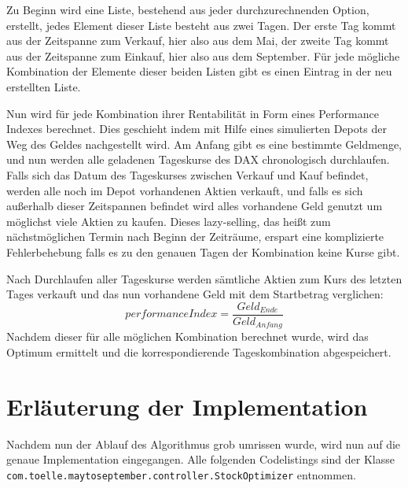 \documentclass[12pt, a4paper, titlepage]{report}
\begin{document}
            Zu Beginn wird eine Liste, bestehend aus jeder durchzurechnenden Option,
            erstellt, jedes Element dieser Liste besteht aus zwei Tagen. Der erste Tag 
            kommt aus der Zeitspanne zum Verkauf, hier also aus dem Mai, der zweite
            Tag kommt aus der Zeitspanne zum Einkauf, hier also aus dem September.
            Für jede mögliche Kombination der Elemente dieser beiden Listen gibt es
            einen Eintrag in der neu erstellten Liste.

            Nun wird für jede Kombination ihrer Rentabilität in Form eines
            Performance Indexes berechnet. Dies geschieht indem mit Hilfe eines
            simulierten Depots der Weg des Geldes nachgestellt wird.
            Am Anfang gibt es eine bestimmte Geldmenge, und nun werden alle
            geladenen Tageskurse des DAX chronologisch durchlaufen.
            Falls sich das Datum des Tageskurses zwischen Verkauf
            und Kauf befindet, werden alle noch im Depot vorhandenen Aktien
            verkauft, und falls es sich außerhalb dieser Zeitspannen befindet
            wird alles vorhandene Geld genutzt um möglichst viele Aktien zu
            kaufen. Dieses lazy-selling, das heißt zum nächstmöglichen Termin nach
            Beginn der Zeiträume, erspart eine komplizierte Fehlerbehebung falls
            es zu den genauen Tagen der Kombination keine Kurse gibt.

            Nach Durchlaufen aller Tageskurse werden sämtliche Aktien zum Kurs des
            letzten Tages verkauft und das nun vorhandene Geld mit dem
            Startbetrag verglichen:
            \begin{equation}
                performanceIndex = \frac{Geld_{Ende}}{Geld_{Anfang}}
            \end{equation}
            Nachdem dieser für alle möglichen Kombination berechnet wurde, wird
            das Optimum ermittelt und die korrespondierende Tageskombination
            abgespeichert.


        \section{Erläuterung der Implementation}
            Nachdem nun der Ablauf des Algorithmus grob umrissen wurde, wird nun
            auf die genaue Implementation eingegangen. Alle folgenden Codelistings
            sind der Klasse \texttt{com.toelle.maytoseptember.controller.StockOptimizer} entnommen.
            
\end{document}
